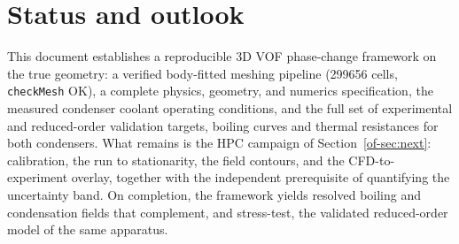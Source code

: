 \documentclass[11pt]{article}
\begin{document}
\section{Status and outlook}
\label{of-sec:status}
This document establishes a reproducible 3D VOF phase-change framework on the true
geometry: a verified body-fitted meshing pipeline (\num{299656} cells, \texttt{checkMesh}
OK), a complete physics, geometry, and numerics specification, the measured condenser
coolant operating conditions, and the full set of experimental and reduced-order
validation targets, boiling curves and thermal resistances for both condensers. What
remains is the HPC campaign of Section~\ref{of-sec:next}: calibration, the run to stationarity,
the field contours, and the CFD-to-experiment overlay, together with the independent
prerequisite of quantifying the uncertainty band. On completion, the framework yields
resolved boiling and condensation fields that complement, and stress-test, the validated
reduced-order model of the same apparatus.
\end{document}
